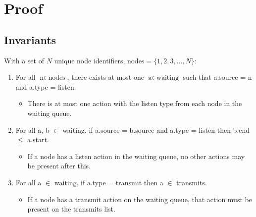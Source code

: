 \clearpage

\section{Proof}

\subsection{Invariants}

With a set of $N$ unique node identifiers, $\text{nodes} = \{ 1, 2, 3, \ldots, N \}$:

\begin{enumerate}
    \item For all $\text{n} \in \text{nodes}$, there exists at most one $\text{a} \in \text{waiting}$ such that a.source = n and a.type = listen.

          \begin{itemize}
              \item There is at most one action with the listen type from each node in the waiting queue.
          \end{itemize}
    \item For all a, b $\in$ waiting, if a.source = b.source and a.type = listen then b.end $\leq$ a.start.
          \begin{itemize}
              \item If a node has a listen action in the waiting queue, no other actions may be present after this.
          \end{itemize}
    \item For all a $\in$ waiting, if a.type = transmit then a $\in$ transmits.
    
          \begin{itemize}
              \item If a node has a transmit action on the waiting queue, that action must be present on the transmits list.
          \end{itemize}

\end{enumerate}

